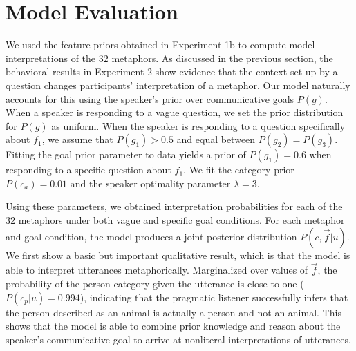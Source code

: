 \documentclass[10pt,letterpaper]{article}
\begin{document}
\section{Model Evaluation}
We used the feature priors obtained in Experiment 1b to compute model interpretations of the $32$ metaphors. As discussed in the previous section, the behavioral results in Experiment 2 show evidence that the context set up by a question changes participants' interpretation of a metaphor. Our model naturally accounts for this using the speaker's prior over communicative goals $P(g)$. When a speaker is responding to a vague question, we set the prior distribution for $P(g)$ as uniform. When the speaker is responding to a question specifically about $f_1$, we assume that $P(g_1) > 0.5$ and equal between $P(g_2) = P(g_3)$. Fitting the goal prior parameter to data yields a prior of $P(g_1) = 0.6$ when responding to a specific question about $f_1$. We fit the category prior $P(c_a) = 0.01$ and the speaker optimality parameter $\lambda = 3$. %

Using these parameters, we obtained interpretation probabilities for each of the $32$ metaphors under both vague and specific goal conditions. For each metaphor and goal condition, the model produces a joint posterior distribution $P(c, \vec f | u)$. We first show a basic but important qualitative result, which is that the model is able to interpret utterances metaphorically. Marginalized over values of $\vec f$, the probability of the person category given the utterance is close to one ($P(c_p | u) = 0.994$), indicating that the pragmatic listener successfully infers that the person described as an animal is actually a person and not an animal. This shows that the model is able to combine prior knowledge and reason about the speaker's communicative goal to arrive at nonliteral interpretations of utterances.

\end{document}
